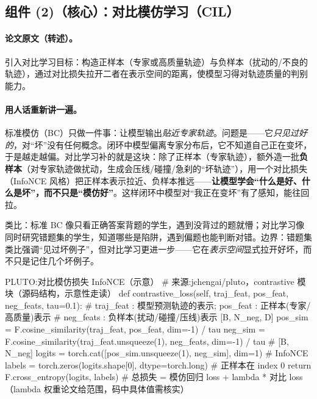 \subsection{组件 (2)（核心）：对比模仿学习（CIL）}
\label{sec:de-cil}

\paragraph{论文原文（转述）。}
引入对比学习目标：构造正样本（专家或高质量轨迹）与负样本（扰动的/不良的轨迹），通过对比损失拉开二者在表示空间的距离，使模型习得对轨迹质量的判别能力\cite{cheng2024pluto}。

\paragraph{用人话重新讲一遍。}
标准模仿（BC）只做一件事：让模型输出\emph{贴近专家轨迹}。问题是——它\emph{只见过好的}，对“坏”没有任何概念。闭环中模型偏离专家分布后，它不知道自己正在变坏，于是越走越偏。对比学习补的就是这块：除了正样本（专家轨迹），额外造一批\textbf{负样本}（对专家轨迹做扰动，生成会压线/碰撞/急刹的“坏轨迹”），用一个对比损失（InfoNCE 风格）把正样本表示拉近、负样本推远——\textbf{让模型学会“什么是好、什么是坏”，而不只是“模仿好”}。这样闭环中模型对“我正在变坏”有了感知，能往回拉。

类比：标准 BC 像只看正确答案背题的学生，遇到没背过的题就懵；对比学习像同时研究错题集的学生，知道哪些是陷阱，遇到偏题也能判断对错。边界：错题集类比强调“见过坏例子”，但对比学习更进一步——它在\emph{表示空间}显式拉开好坏，而不只是记住几个坏例子。

\begin{codebox}[Python]{PLUTO:对比模仿损失 InfoNCE（示意）}
# 来源:jchengai/pluto，contrastive 模块（源码结构，示意性走读）
def contrastive_loss(self, traj_feat, pos_feat, neg_feats, tau=0.1):
    # traj_feat : 模型预测轨迹的表示; pos_feat : 正样本(专家/高质量)表示
    # neg_feats : 负样本(扰动/碰撞/压线)表示 [B, N_neg, D]
    pos_sim = F.cosine_similarity(traj_feat, pos_feat, dim=-1) / tau
    neg_sim = F.cosine_similarity(traj_feat.unsqueeze(1), neg_feats, dim=-1) / tau  # [B, N_neg]
    logits = torch.cat([pos_sim.unsqueeze(1), neg_sim], dim=1)   # InfoNCE
    labels = torch.zeros(logits.shape[0], dtype=torch.long)      # 正样本在 index 0
    return F.cross_entropy(logits, labels)
# 总损失 = 模仿回归 loss + lambda * 对比 loss（lambda 权重论文给范围，码中具体值需核实）
\end{codebox}

